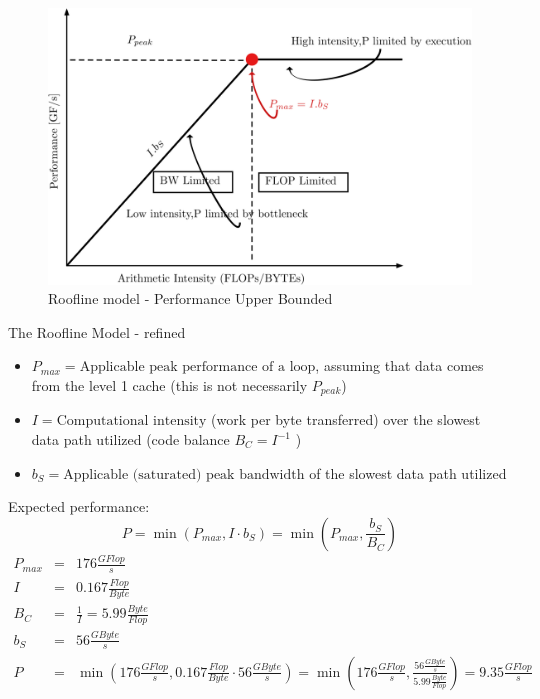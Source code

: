 \documentclass{article}
\begin{document}
\begin{figure}[!htp]
    \centering
    \includegraphics[width=.6\textwidth, height=.4\textwidth]{Roofline_0_1.png}
    \caption{Roofline model - Performance Upper Bounded}
    \label{Roofline_0_1}
\end{figure}
 The Roofline Model - refined
\begin{itemize}
\item $P_{max} = \mbox{Applicable peak performance of a loop}$, assuming that data comes from the level 1 cache (this is not necessarily $P_{peak}$)
\item $I = \mbox{Computational intensity}$ (work per byte transferred) over the slowest data path utilized (code balance $B_C = I^{-1}$ )
\item $b_S = \mbox{Applicable (saturated) peak bandwidth}$ of the slowest data path utilized
\end{itemize}
Expected performance:
\begin{equation*}
 P = \min \left(P_{max} , I \cdot b_S\right) = \min \left(P_{max}, \frac{b_S}{B_C}\right)
\end{equation*}
\begin{eqnarray*}
P_{max} & = & 176 \frac{GFlop}{s}\\
I   & = & 0.167 \frac{Flop}{Byte}\\
B_C & = & \frac{1}{I} = 5.99 \frac{Byte}{Flop}\\
b_S & = & 56 \frac{GByte}{s}\\
 P & = & \min \left(176 \frac{GFlop}{s} , 0.167 \frac{Flop}{Byte} \cdot 56 \frac{GByte}{s}\right) = \min \left(176 \frac{GFlop}{s}, \frac{56 \frac{GByte}{s}}{5.99 \frac{Byte}{Flop}}\right) = 9.35 \frac{GFlop}{s}
\end{eqnarray*}
\end{document}
